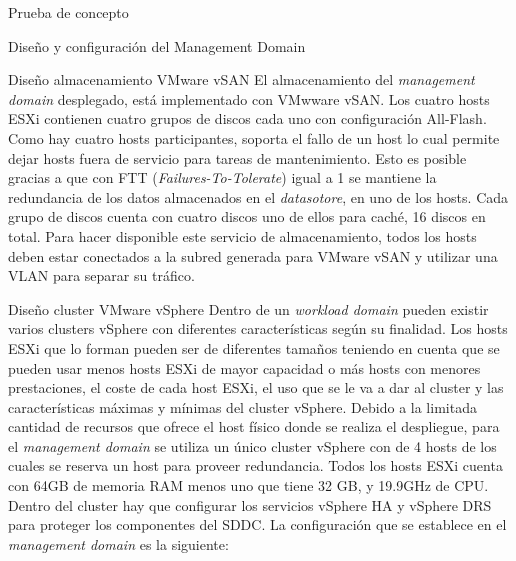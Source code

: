\begin{section}{Prueba de concepto}
\begin{subsection}{Diseño y configuración del Management Domain}
    
    \begin{subsubsection}{Diseño almacenamiento VMware vSAN}
      El almacenamiento del \textit{management domain} desplegado, está implementado con VMwware vSAN. Los cuatro hosts ESXi contienen cuatro grupos de discos cada uno con configuración All-Flash. Como hay cuatro hosts participantes, soporta el fallo de un host lo cual permite dejar hosts fuera de servicio para tareas de mantenimiento. Esto es posible gracias a que con FTT (\textit{Failures-To-Tolerate}) igual a 1 se mantiene la redundancia de los datos almacenados en el \textit{datasotore}, en uno de los hosts. Cada grupo de discos cuenta con cuatro discos uno de ellos para caché, 16 discos en total. Para hacer disponible este servicio de almacenamiento, todos los hosts deben estar conectados a la subred generada para VMware vSAN y utilizar una VLAN para separar su tráfico.
    \end{subsubsection}
        
    \begin{subsubsection}{Diseño cluster VMware vSphere}
    Dentro de un \textit{workload domain} pueden existir varios clusters vSphere con diferentes características según su finalidad. Los hosts ESXi que lo forman pueden ser de diferentes tamaños teniendo en cuenta que se pueden usar menos hosts ESXi de mayor capacidad o más hosts con menores prestaciones, el coste de cada host ESXi, el uso que se le va a dar al cluster y las características máximas y mínimas del cluster vSphere. Debido a la limitada cantidad de recursos que ofrece el host físico donde se realiza el despliegue, para el \textit{management domain} se utiliza un único cluster vSphere con de 4 hosts de los cuales se reserva un host para proveer redundancia. Todos los hosts ESXi cuenta con 64GB de memoria RAM menos uno que tiene 32 GB, y 19.9GHz de CPU. Dentro del cluster hay que configurar los servicios vSphere HA y vSphere DRS para proteger los componentes del SDDC. La configuración que se establece en el \textit{management domain} es la siguiente:
   

\end{subsubsection}
\end{subsection}
\end{section}
